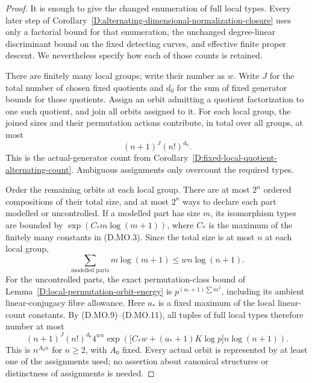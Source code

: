 \begin{proof}
It is enough to give the changed enumeration of full local
types. Every later step of
Corollary~\ref{D:alternating-dimensional-normalization-closure}
uses only a factorial bound for that enumeration, the
unchanged degree-linear discriminant bound on the fixed
detecting curves, and effective finite proper descent.
We nevertheless specify how each of those counts is retained.

There are finitely many local groups; write their number
as $w$. Write $J$ for the total number of chosen fixed
quotients and $d_0$ for the sum of fixed generator bounds
for those quotients. Assign an orbit admitting a quotient
factorization to one such quotient, and join all orbits
assigned to it. For each local group, the joined sizes
and their permutation actions contribute, in total over
all groups, at most
\[
                       (n+1)^J(n!)^{d_0}.                \tag{D.MO.10}
\]
This is the actual-generator count from
Corollary~\ref{D:fixed-local-quotient-alternating-count}.
Ambiguous assignments only overcount the required types.

Order the remaining orbits at each local group. There are
at most $2^n$ ordered compositions of their total size,
and at most $2^n$ ways to declare each part modelled or
uncontrolled. If a modelled part has size $m$, its
isomorphism types are bounded by
$\exp(C_*m\log(m+1))$, where $C_*$ is the maximum of
the finitely many constants in (D.MO.3). Since the total
size is at most $n$ at each local group,
\[
       \sum_{\text{modelled parts}}m\log(m+1)
                            \le w n\log(n+1).           \tag{D.MO.11}
\]
For the uncontrolled parts, the exact permutation-class
bound of Lemma~\ref{D:local-permutation-orbit-energy}
is $p^{(a_*+1)\sum m^2}$, including its ambient
linear-conjugacy fibre allowance. Here $a_*$ is a
fixed maximum of the local linear-count constants.
By (D.MO.9)--(D.MO.11), all tuples of full local types
therefore number at most
\[
 (n+1)^J(n!)^{d_0}4^{wn}
 \exp\!\left(\bigl[C_*w+(a_*+1)K\log p\bigr]
                                      n\log(n+1)\right).
                                                        \tag{D.MO.12}
\]
This is $n^{A_0n}$ for $n\ge2$, with $A_0$ fixed.
Every actual orbit is represented by at least one of
the assignments used; no assertion about canonical
structures or distinctness of assignments is needed.


\end{proof}
